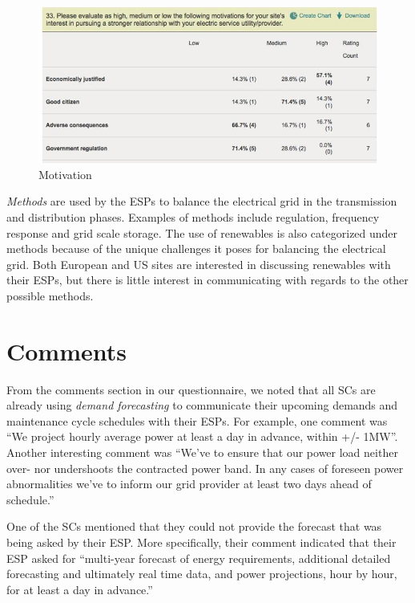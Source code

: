 \documentclass{article}
\begin{document}
\begin{figure}
\begin{center}
\includegraphics[scale=0.5]{figs/Table2.jpg}
\caption{Motivation}
\label{fig:table2}
\end{center}
\end{figure}

\emph{Methods} are used by the ESPs to balance the electrical grid in the transmission and distribution phases. Examples of methods include regulation, frequency response and grid scale storage.  The use of renewables is also categorized under methods because of the unique challenges it poses for balancing the electrical grid.  Both European and US sites are interested in discussing renewables with their ESPs, but there is little interest in communicating with regards to the other possible methods.

\section{Comments}
\label{comm}
From the comments section in our questionnaire, we noted that all SCs are already using \emph{demand forecasting} to communicate their upcoming demands and maintenance cycle schedules with their ESPs. For example, one comment was ``We project hourly average power at least a day in advance, within +/- 1MW''. Another interesting comment was ``We've to ensure that our power load neither over- nor undershoots the contracted power band. In any cases of foreseen power abnormalities we've to inform our grid provider at least two days ahead of schedule.''

One of the SCs mentioned that they could not provide the forecast that was being asked by their ESP. More specifically, their comment indicated that their ESP asked for ``multi-year forecast of energy requirements, additional detailed forecasting and ultimately real time data, and power projections, hour by hour, for at least a day in advance.''
\end{document}
